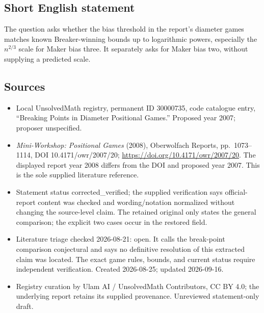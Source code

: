 \documentclass[11pt]{article}
\begin{document}
\subsection{Short English statement}
The question asks whether the bias threshold in the report's diameter games matches known Breaker-winning bounds up to logarithmic powers, especially the $n^{2/3}$ scale for Maker bias three. It separately asks for Maker bias two, without supplying a predicted scale.
\subsection{Sources}
\begin{itemize}
\item Local UnsolvedMath registry, permanent ID 30000735, code catalogue entry, ``Breaking Points in Diameter Positional Games.'' Proposed year 2007; proposer unspecified.
\item \emph{Mini-Workshop: Positional Games} (2008), Oberwolfach Reports, pp.\ 1073--1114, DOI 10.4171/owr/2007/20; \url{https://doi.org/10.4171/owr/2007/20}. The displayed report year 2008 differs from the DOI and proposed year 2007. This is the sole supplied literature reference.
\item Statement status corrected\_verified; the supplied verification says official-report content was checked and wording/notation normalized without changing the source-level claim. The retained original only states the general comparison; the explicit two cases occur in the restored field.
\item Literature triage checked 2026-08-21: open. It calls the break-point comparison conjectural and says no definitive resolution of this extracted claim was located. The exact game rules, bounds, and current status require independent verification. Created 2026-08-25; updated 2026-09-16.
\item Registry curation by Ulam AI / UnsolvedMath Contributors, CC BY 4.0; the underlying report retains its supplied provenance. Unreviewed statement-only draft.
\end{itemize}
\end{document}
